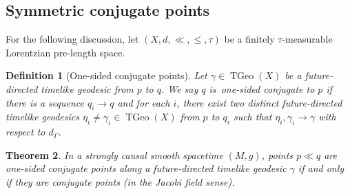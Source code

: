 \documentclass[a4paper,11pt]{article}
\numberwithin{equation}{section}
\theoremstyle{plain}
\newtheorem{Definition}{Definition}[section]
\newtheorem{Theorem}[Definition]{Theorem}
\theoremstyle{definition}
\DeclareMathOperator{\TGeo}{TGeo}
\begin{document}
\subsection{Symmetric conjugate points}
\label{Subsection: symmetric conjugate points}

For the following discussion, let $(X,d,\ll,\leq, \tau)$ be a finitely $\tau$-measurable Lorentzian pre-length space.

\begin{Definition}[One-sided conjugate points]
Let $\gamma \in \TGeo(X)$ be a future-directed timelike geodesic from $p$ to $q$. We say $q$ is~\emph{one-sided conjugate to} $p$ if there is a sequence $q_i \to q$ and for each $i$, there exist two distinct future-directed timelike geodesics $\eta_i \neq \gamma_i \in \TGeo(X)$ from $p$ to $q_i$ such that $ \eta_i,\gamma_i \to \gamma$ with respect to $d_{\Gamma}$.
\end{Definition}

\begin{Theorem}\label{th:one-sided-vs-classical}
In a strongly causal smooth spacetime $(M,g)$, points $p\ll q$ are one-sided conjugate points along a future-directed timelike geodesic $\gamma$ if and only if they are conjugate points (in the Jacobi field sense).
\end{Theorem}
\end{document}
